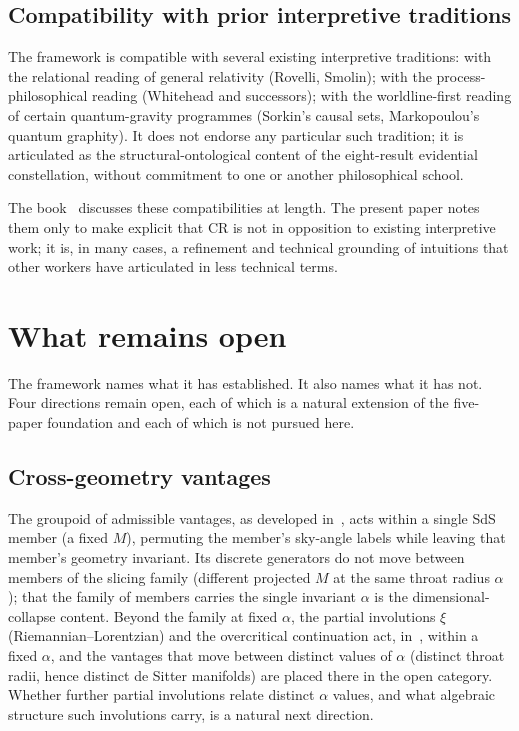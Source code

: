 \documentclass[11pt,a4paper]{article}
\theoremstyle{definition}
\begin{document}
\subsection{Compatibility with prior interpretive traditions}\label{sec:compatibility}

The framework is compatible with several existing interpretive traditions: with the relational reading of general relativity (Rovelli, Smolin); with the process-philosophical reading (Whitehead and successors); with the worldline-first reading of certain quantum-gravity programmes (Sorkin's causal sets, Markopoulou's quantum graphity). It does not endorse any particular such tradition; it is articulated as the structural-ontological content of the eight-result evidential constellation, without commitment to one or another philosophical school.

The book~\cite{Janzen2025} discusses these compatibilities at length. The present paper notes them only to make explicit that CR is not in opposition to existing interpretive work; it is, in many cases, a refinement and technical grounding of intuitions that other workers have articulated in less technical terms.

\section{What remains open}\label{sec:open}

The framework names what it has established. It also names what it has not. Four directions remain open, each of which is a natural extension of the five-paper foundation and each of which is not pursued here.

\subsection{Cross-geometry vantages}\label{sec:cross-geometry}

The groupoid of admissible vantages, as developed in~\cite{JanzenGroupoid}, acts within a single SdS member (a fixed $M$), permuting the member's sky-angle labels while leaving that member's geometry invariant. Its discrete generators do not move between members of the slicing family (different projected $M$ at the same throat radius $\alpha$); that the family of members carries the single invariant $\alpha$ is the dimensional-collapse content. Beyond the family at fixed $\alpha$, the partial involutions $\xi$ (Riemannian--Lorentzian) and the overcritical continuation act, in~\cite{JanzenGroupoid}, within a fixed $\alpha$, and the vantages that move between distinct values of $\alpha$ (distinct throat radii, hence distinct de Sitter manifolds) are placed there in the open category. Whether further partial involutions relate distinct $\alpha$ values, and what algebraic structure such involutions carry, is a natural next direction.
\end{document}

